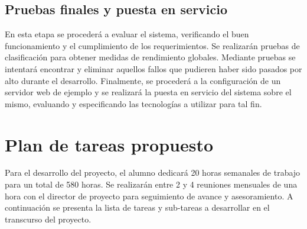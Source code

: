 \documentclass[12pt,bibliography=oldstyle,DIV=12,parskip=full-,titlepage]{scrartcl}
\begin{document}
\subsection{Pruebas finales y puesta en servicio}
En esta etapa se procederá a evaluar el sistema, verificando el buen
funcionamiento y el cumplimiento de los requerimientos. Se realizarán
pruebas de clasificación para obtener medidas de rendimiento
globales. Mediante pruebas se intentará encontrar y eliminar
aquellos fallos que pudieren haber sido pasados por alto durante el
desarrollo.
%
Finalmente, se procederá a la configuración de un servidor web de
ejemplo y se realizará la puesta en servicio del sistema sobre el
mismo, evaluando y especificando las tecnologías a utilizar para tal
fin.
%
%
\newpage
\section{Plan de tareas propuesto}
Para el desarrollo del proyecto, el alumno dedicará 20 horas semanales
de trabajo para un total de 580 horas.  Se realizarán entre 2 y 4
reuniones mensuales de una hora con el director de proyecto para
seguimiento de avance y asesoramiento.
%
A continuación se presenta la lista de tareas y sub-tareas a
desarrollar en el transcurso del proyecto.
\end{document}
